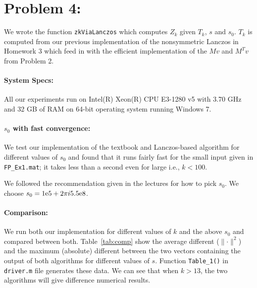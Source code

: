\section*{Problem 4:}
We wrote the function \texttt{zkViaLanczos} which computes $Z_k$	given $T_{k}$, $s$ and $s_{0}$. $T_{k}$ is computed from our previous implementation of the nonsymmetric Lanczos in Homework 3 which feed in with the efficient implementation of the $Mv$ and $M^{T}v$ from Problem 2. 

\paragraph{System Specs:} All our experiments run on Intel(R) Xeon(R) CPU E3-1280 v5 with 3.70 GHz and 32 GB of RAM on 64-bit operating system running Windows 7. 

\paragraph{$s_0$ with fast convergence:} We test our implementation of the textbook and Lanczos-based algorithm for different values of $s_{0}$ and found that it runs fairly fast for the small input given in \texttt{FP\_Ex1.mat}; it takes less than a second even for large i.e., $k < 100$. 

We followed the recommendation given in the lectures for how to pick $s_{0}$. We choose $s_{0} = {1}\mathrm{e}{5} + 2\pi i {5.5}\mathrm{e}{8} $. 

\paragraph{Comparison:} We run both our implementation for different values of $k$ and the above $s_{0}$ and compared between both. Table~\ref{tab:comp} show the average different ($\parallel \cdot \parallel^{2}$) and the maximum (absolute) different between the two vectors containing the output of both algorithms for different values of $s$. Function \texttt{Table\_1()} in \texttt{driver.m} file generates these data. We can see that when $k>13$, the two algorithms will give difference numerical results. 

